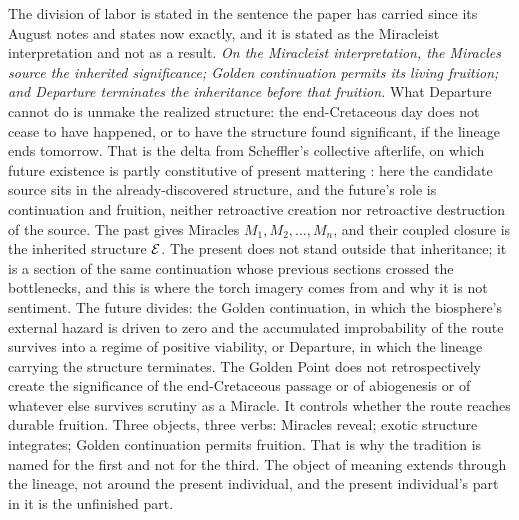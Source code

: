 The division of labor is stated in the sentence the paper has carried
since its August notes and states now exactly, and it is stated as the
Miracleist interpretation and not as a result. \emph{On the Miracleist
interpretation, the Miracles source the inherited significance; Golden
continuation permits its living fruition; and Departure terminates the
inheritance before that fruition.} What Departure cannot do is unmake
the realized structure: the end-Cretaceous day does not cease to have
happened, or to have the structure found significant, if the lineage
ends tomorrow. That is the delta from Scheffler's collective
afterlife, on which future existence is partly constitutive of present
mattering \cite{Scheffler13}: here the candidate source sits in the
already-discovered structure, and the future's role is continuation and
fruition, neither retroactive creation nor retroactive destruction of
the source. The past gives Miracles $M_1,M_2,\dots,M_n$, and their coupled
closure is the inherited structure $\mathcal{E}$. The present does not stand
outside that inheritance; it is a section of the same continuation
whose previous sections crossed the bottlenecks, and this is where the
torch imagery comes from and why it is not sentiment. The future
divides: the Golden continuation, in which the biosphere's external
hazard is driven to zero and the accumulated improbability of the
route survives into a regime of positive viability, or Departure, in
which the lineage carrying the structure terminates. The Golden Point
does not retrospectively create the significance of the end-Cretaceous
passage or of abiogenesis or of whatever else survives scrutiny as a
Miracle. It controls whether the route reaches durable fruition. Three
objects, three verbs: Miracles reveal; exotic structure integrates;
Golden continuation permits fruition. That is why the tradition is named for
the first and not for the third. The object of meaning extends through
the lineage, not around the present individual, and the present
individual's part in it is the unfinished part.

